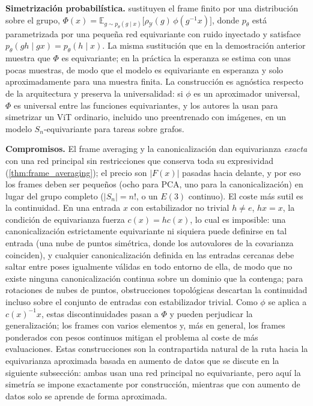 \textbf{Simetrización probabilística.} \citet{kim2023probabilisticsymmetrization} sustituyen el frame finito por una distribución sobre el grupo, $\Phi(x) = \mathbb{E}_{g \sim p_\theta(g \mid x)}\big[\rho_{\mathcal{Y}}(g)\, \phi(g^{-1}x)\big]$, donde $p_\theta$ está parametrizada por una pequeña red equivariante con ruido inyectado y satisface $p_\theta(gh \mid gx) = p_\theta(h \mid x)$. La misma sustitución que en la demostración anterior muestra que $\Phi$ es equivariante; en la práctica la esperanza se estima con unas pocas muestras, de modo que el modelo es equivariante en esperanza y solo aproximadamente para una muestra finita. La construcción es agnóstica respecto de la arquitectura y preserva la universalidad: si $\phi$ es un aproximador universal, $\Phi$ es universal entre las funciones equivariantes, y los autores la usan para simetrizar un \gls{ViT} ordinario, incluido uno preentrenado con imágenes, en un modelo $S_n$-equivariante para tareas sobre grafos.

\textbf{Compromisos.} El frame averaging y la canonicalización dan equivarianza \emph{exacta} con una red principal sin restricciones que conserva toda su expresividad (\autoref{thm:frame_averaging}); el precio son $|F(x)|$ pasadas hacia delante, y por eso los frames deben ser pequeños (ocho para \gls{PCA}, uno para la canonicalización) en lugar del grupo completo ($|S_n| = n!$, o un $E(3)$ continuo). El coste más sutil es la continuidad. En una entrada $x$ con estabilizador no trivial $h \neq e$, $hx = x$, la condición de equivarianza fuerza $c(x) = hc(x)$, lo cual es imposible: una canonicalización estrictamente equivariante ni siquiera puede definirse en tal entrada (una nube de puntos simétrica, donde los autovalores de la covarianza coinciden), y cualquier canonicalización definida en las entradas cercanas debe saltar entre poses igualmente válidas en todo entorno de ella, de modo que no existe ninguna canonicalización continua sobre un dominio que la contenga; para rotaciones de nubes de puntos, obstrucciones topológicas descartan la continuidad incluso sobre el conjunto de entradas con estabilizador trivial. Como $\phi$ se aplica a $c(x)^{-1}x$, estas discontinuidades pasan a $\Phi$ y pueden perjudicar la generalización; los frames con varios elementos y, más en general, los frames ponderados con pesos continuos mitigan el problema al coste de más evaluaciones. Estas construcciones son la contrapartida natural de la ruta hacia la equivarianza aproximada basada en aumento de datos que se discute en la siguiente subsección: ambas usan una red principal no equivariante, pero aquí la simetría se impone exactamente por construcción, mientras que con aumento de datos solo se aprende de forma aproximada.

